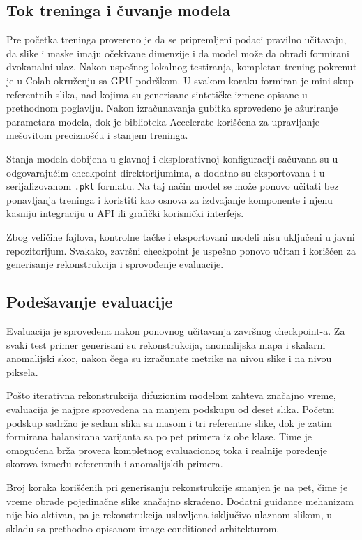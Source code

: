\documentclass[10pt]{article}
\begin{document}
	\subsection{Tok treninga i čuvanje modela}
	
	Pre početka treninga provereno je da se pripremljeni podaci pravilno učitavaju, da slike i maske imaju očekivane dimenzije i da model može da obradi formirani dvokanalni ulaz. Nakon uspešnog lokalnog testiranja, kompletan trening pokrenut je u Colab okruženju sa GPU podrškom. U svakom koraku formiran je mini-skup referentnih slika, nad kojima su generisane sintetičke izmene opisane u prethodnom poglavlju. Nakon izračunavanja gubitka sprovedeno je ažuriranje parametara modela, dok je biblioteka Accelerate korišćena za upravljanje mešovitom preciznošću i stanjem treninga.
	
	Stanja modela dobijena u glavnoj i eksplorativnoj konfiguraciji sačuvana su u odgovarajućim checkpoint direktorijumima, a dodatno su eksportovana i u serijalizovanom \texttt{.pkl} formatu. Na taj način model se može ponovo učitati bez ponavljanja treninga i koristiti kao osnova za izdvajanje komponente i njenu kasniju integraciju u API ili grafički korisnički interfejs.  
	
	Zbog veličine fajlova, kontrolne tačke i eksportovani modeli nisu uključeni u javni repozitorijum. Svakako, završni checkpoint je uspešno ponovo učitan i korišćen za generisanje rekonstrukcija i sprovođenje evaluacije.
	
	\subsection{Podešavanje evaluacije}
	
	Evaluacija je sprovedena nakon ponovnog učitavanja završnog checkpoint-a. Za svaki test primer generisani su rekonstrukcija, anomalijska mapa i skalarni anomalijski skor, nakon čega su izračunate metrike na nivou slike i na nivou piksela.
	
	Pošto iterativna rekonstrukcija difuzionim modelom zahteva značajno vreme, evaluacija je najpre sprovedena na manjem podskupu od deset slika. Početni podskup sadržao je sedam slika sa masom i tri referentne slike, dok je zatim formirana balansirana varijanta sa po pet primera iz obe klase. Time je omogućena brža provera kompletnog evaluacionog toka i realnije poređenje skorova između referentnih i anomalijskih primera.
	
	Broj koraka korišćenih pri generisanju rekonstrukcije smanjen je na pet, čime je vreme obrade pojedinačne slike značajno skraćeno. Dodatni guidance mehanizam nije bio aktivan, pa je rekonstrukcija uslovljena isključivo ulaznom slikom, u skladu sa prethodno opisanom image-conditioned arhitekturom.
	
\end{document}
